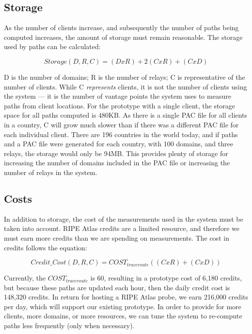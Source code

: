 \subsection{Storage}
As the number of clients increase, and subsequently the number of paths being 
computed increases, the amount of storage must remain reasonable.  The storage 
used by paths can be calculated:

\[Storage(D,R,C) = (D x R) + 2(C x R) + (C x D) \]

D is the number of domains; R is the number of relays; C is representative of the number of 
clients.  While C {\it represents} clients, it is not the number of clients using the 
system --- it is the number of vantage points the system uses to measure paths 
from client locations.  For the prototype with a single client, the storage space for all 
paths computed is 480KB.  As there is a single PAC file for all clients in 
a country, C will grow much slower than if there was a different PAC file for 
each individual client.  There are 196 countries in the world today, and if 
paths and a PAC file were generated for each country, with 100 domains, and 
three relays, the storage would only be 94MB.  This provides plenty of storage 
for increasing the number of domains included in the PAC file or increasing 
the number of relays in the system.

\subsection{Costs}
In addition to storage, the cost of the measurements used in the system must 
be taken into account.  RIPE Atlas credits are a limited resource, and therefore 
we must earn more credits than we are spending on measurements.  The cost 
in credits follows the equation:

\[Credit\_Cost(D,R,C) = COST_{traceroute}((C x R) + (C x D))\]

Currently, the $COST_{traceroute}$ is 60, resulting in a prototype cost of 6,180 
credits, but because these paths are updated each hour, then 
the daily credit cost is 148,320 credits.  In return for hosting a RIPE Atlas 
probe, we earn 216,000 credits per day, which will support our existing 
prototype.  In order to provide for more clients, more domains, or more 
resources, we can tune the system to re-compute paths less frequently (only when necessary).
